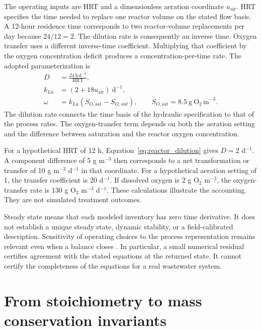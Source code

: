 The operating inputs are HRT and a dimensionless aeration coordinate $u_{\mathrm{air}}$. HRT specifies the time needed to replace one reactor volume on the stated flow basis. A 12-hour residence time corresponds to two reactor-volume replacements per day because $24/12=2$. The dilution rate is consequently an inverse time. Oxygen transfer uses a different inverse-time coefficient. Multiplying that coefficient by the oxygen concentration deficit produces a concentration-per-time rate. The adopted parameterization is
\begin{align}
D&=\frac{24\ \mathrm{h\,d}^{-1}}{\mathrm{HRT}},\label{eq:reactor_dilution}\\
k_{La}&=(2+18u_{\mathrm{air}})\ \mathrm{d}^{-1},\label{eq:reactor_transfer_coefficient}\\
\omega&=k_{La}(S_{O,\mathrm{sat}}-S_{O,out}),\qquad
S_{O,\mathrm{sat}}=8.5\ \mathrm{g\ O_2\,m}^{-3}.
\label{eq:reactor_oxygen_transfer}
\end{align}
The dilution rate connects the time basis of the hydraulic specification to that of the process rates. The oxygen-transfer term depends on both the aeration setting and the difference between saturation and the reactor oxygen concentration.

For a hypothetical HRT of 12 h, Equation~\eqref{eq:reactor_dilution} gives $D=2$ d$^{-1}$. A component difference of 5 g m$^{-3}$ then corresponds to a net transformation or transfer of 10 g m$^{-3}$ d$^{-1}$ in that coordinate. For a hypothetical aeration setting of 1, the transfer coefficient is 20 d$^{-1}$. If dissolved oxygen is 2 g O$_2$ m$^{-3}$, the oxygen-transfer rate is 130 g O$_2$ m$^{-3}$ d$^{-1}$. These calculations illustrate the accounting. They are not simulated treatment outcomes.

Steady state means that each modeled inventory has zero time derivative. It does not establish a unique steady state, dynamic stability, or a field-calibrated description. Sensitivity of operating choices to the process representation remains relevant even when a balance closes \citep{Araujo2013}. In particular, a small numerical residual certifies agreement with the stated equations at the returned state. It cannot certify the completeness of the equations for a real wastewater system.

\section{From stoichiometry to mass conservation invariants}


